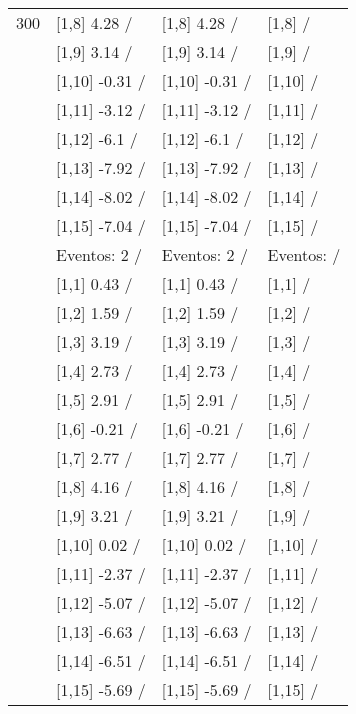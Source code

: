 \begin{table}
\begin{tabular}[t]{llll}
300 & {}[1,8] 4.28  / & {}[1,8] 4.28  / & {}[1,8]  /\\
\addlinespace
 & {}[1,9] 3.14  / & {}[1,9] 3.14  / & {}[1,9]  /\\
 & {}[1,10] -0.31  / & {}[1,10] -0.31  / & {}[1,10]  /\\
 & {}[1,11] -3.12  / & {}[1,11] -3.12  / & {}[1,11]  /\\
 & {}[1,12] -6.1  / & {}[1,12] -6.1  / & {}[1,12]  /\\
 & {}[1,13] -7.92  / & {}[1,13] -7.92  / & {}[1,13]  /\\
\addlinespace
 & {}[1,14] -8.02  / & {}[1,14] -8.02  / & {}[1,14]  /\\
 & {}[1,15] -7.04  / & {}[1,15] -7.04  / & {}[1,15]  /\\
 & Eventos:  2 / & Eventos:  2 / & Eventos:   /\\
 & {}[1,1] 0.43  / & {}[1,1] 0.43  / & {}[1,1]  /\\
 & {}[1,2] 1.59  / & {}[1,2] 1.59  / & {}[1,2]  /\\
\addlinespace
 & {}[1,3] 3.19  / & {}[1,3] 3.19  / & {}[1,3]  /\\
 & {}[1,4] 2.73  / & {}[1,4] 2.73  / & {}[1,4]  /\\
 & {}[1,5] 2.91  / & {}[1,5] 2.91  / & {}[1,5]  /\\
 & {}[1,6] -0.21  / & {}[1,6] -0.21  / & {}[1,6]  /\\
 & {}[1,7] 2.77  / & {}[1,7] 2.77  / & {}[1,7]  /\\
\addlinespace
500 & {}[1,8] 4.16  / & {}[1,8] 4.16  / & {}[1,8]  /\\
 & {}[1,9] 3.21  / & {}[1,9] 3.21  / & {}[1,9]  /\\
 & {}[1,10] 0.02  / & {}[1,10] 0.02  / & {}[1,10]  /\\
 & {}[1,11] -2.37  / & {}[1,11] -2.37  / & {}[1,11]  /\\
 & {}[1,12] -5.07  / & {}[1,12] -5.07  / & {}[1,12]  /\\
\addlinespace
 & {}[1,13] -6.63  / & {}[1,13] -6.63  / & {}[1,13]  /\\
 & {}[1,14] -6.51  / & {}[1,14] -6.51  / & {}[1,14]  /\\
 & {}[1,15] -5.69  / & {}[1,15] -5.69  / & {}[1,15]  /\\
\bottomrule
\end{tabular}
\end{table}
